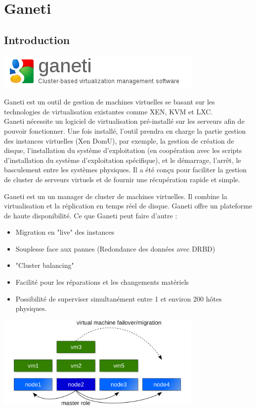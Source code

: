 \chapter{Ganeti}
\section{Introduction}

\includegraphics{images/logo_ganeti.png}

Ganeti est un outil de gestion de machines virtuelles se basant sur les technologies de virtualisation existantes comme XEN, KVM et LXC.\\
Ganeti nécessite un logiciel de virtualisation pré-installé sur les serveurs afin de pouvoir fonctionner. Une fois installé, 
l'outil prendra en charge la partie gestion des instances virtuelles (Xen DomU), par exemple, la gestion de création de disque, 
l'installation du système d'exploitation (en coopération avec les scripts d'installation du système d'exploitation 
spécifique), et le démarrage, l'arrêt, le basculement entre les systèmes physiques. Il a été conçu pour faciliter la gestion de 
cluster de serveurs virtuels et de fournir une récupération rapide et simple.

Ganeti est un un manager de cluster de machines virtuelles. Il combine la virtualisation et la réplication en temps réel de disque.
Ganeti offre un plateforme de haute disponibilité.
Ce que Ganeti peut faire d'autre :
\begin{itemize}
\item Migration en "live" des instances
\item Souplesse face aux pannes (Redondance des données avec DRBD)
\item "Cluster balancing"
\item Facilité pour les réparations et les changements matériels
\item Possibilité de superviser simultanément entre 1 et environ 200 hôtes physiques.
\end{itemize}

\includegraphics[width=10cm]{images/principe_ganeti.png}



